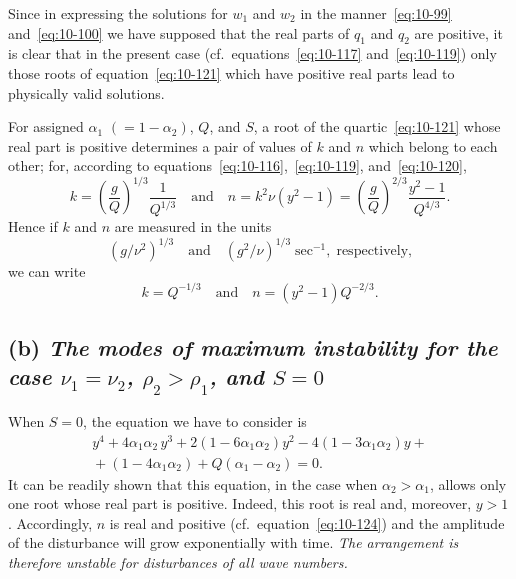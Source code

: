 Since in expressing the solutions for $w_1$ and $w_2$ in the manner~\eqref{eq:10-99} and~\eqref{eq:10-100} we have supposed that the real parts of $q_1$ and $q_2$ are positive, it is clear that in the present case (cf.\ equations~\eqref{eq:10-117} and~\eqref{eq:10-119}) only those roots of equation~\eqref{eq:10-121} which have positive real parts lead to physically valid solutions.

For assigned $\alpha_1$ $(= 1-\alpha_2)$, $Q$, and $S$, a root of the quartic~\eqref{eq:10-121} whose real part is positive determines a pair of values of $k$ and $n$ which belong to each other; for, according to equations~\eqref{eq:10-116},~\eqref{eq:10-119}, and~\eqref{eq:10-120},
\begin{equation}
\label{eq:10-122}
k = \left(\frac{g}{Q}\right)^{1/3}\!\!\frac{1}{Q^{1/3}} \quad\text{and}\quad n = k^2\nu(y^2-1) = \left(\frac{g}{Q}\right)^{2/3}\!\!\frac{y^2-1}{Q^{4/3}}.
\end{equation}
Hence if $k$ and $n$ are measured in the units
\begin{equation}
\label{eq:10-123}
(g/\nu^2)^{1/3}\quad\text{and}\quad (g^2/\nu)^{1/3}\;\text{sec}^{-1},\;\text{respectively,}
\end{equation}
we can write
\begin{equation}
\label{eq:10-124}
k = Q^{-1/3} \quad\text{and}\quad n = (y^2-1)Q^{-2/3}.
\end{equation}

\subsection*{(b) \textit{The modes of maximum instability for the case $\nu_1 = \nu_2$, $\rho_2 > \rho_1$, and $S = 0$}}

When $S = 0$, the equation we have to consider is
\begin{align}
\label{eq:10-125}
y^4+4\alpha_1\alpha_2\,y^3+2(1-6\alpha_1\alpha_2)y^2-4(1-3\alpha_1\alpha_2)y + {} \nonumber\\
{} + (1-4\alpha_1\alpha_2)+Q(\alpha_1-\alpha_2) = 0.
\end{align}
It can be readily shown that this equation, in the case when $\alpha_2 > \alpha_1$, allows only one root whose real part is positive. Indeed, this root is real and, moreover, $y > 1$. Accordingly, $n$ is real and positive (cf.\ equation~\eqref{eq:10-124}) and the amplitude of the disturbance will grow exponentially with time. \emph{The arrangement is therefore unstable for disturbances of all wave numbers.}

